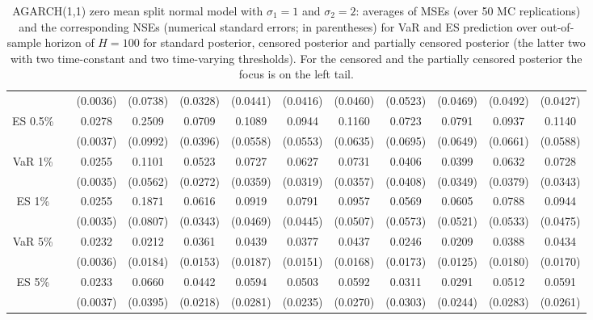 {{\begin{sidewaystable}
\begin{tabular}{cc cc | cccc | cccc}
  && (0.0036) & (0.0738) & (0.0328) & (0.0441) & (0.0416) & (0.0460) &(0.0523) & (0.0469) & (0.0492) & (0.0427) \\ 
\rowcolor{LightCyan} 
ES 0.5\% && 0.0278 & 0.2509 & 0.0709 & 0.1089 & 0.0944 & 0.1160 &0.0723 & 0.0791 & 0.0937 & 0.1140 \\ 
  && (0.0037) & (0.0992) & (0.0396) & (0.0558) & (0.0553) & (0.0635) &(0.0695) & (0.0649) & (0.0661) & (0.0588) \\ [1ex] 
\rowcolor{LightCyan} 
VaR 1\% && 0.0255 & 0.1101 & 0.0523 & 0.0727 & 0.0627 & 0.0731 &0.0406 & 0.0399 & 0.0632 & 0.0728 \\   
 && (0.0035) & (0.0562) & (0.0272) & (0.0359) & (0.0319) & (0.0357) &(0.0408) & (0.0349) & (0.0379) & (0.0343) \\  
\rowcolor{LightCyan} 
ES 1\% && 0.0255 & 0.1871 & 0.0616 & 0.0919 & 0.0791 & 0.0957 &0.0569 & 0.0605 & 0.0788 & 0.0944 \\ 
  && (0.0035) & (0.0807) & (0.0343) & (0.0469) & (0.0445) & (0.0507) &(0.0573) & (0.0521) & (0.0533) & (0.0475) \\ [1ex]
\rowcolor{LightCyan} 
VaR 5\% && 0.0232 & 0.0212 & 0.0361 & 0.0439 & 0.0377 & 0.0437 &0.0246 & 0.0209 & 0.0388 & 0.0434 \\ 
  && (0.0036) & (0.0184) & (0.0153) & (0.0187) & (0.0151) & (0.0168) &(0.0173) & (0.0125) & (0.0180) & (0.0170) \\ 
\rowcolor{LightCyan} 
ES 5\% && 0.0233 & 0.0660 & 0.0442 & 0.0594 & 0.0503 & 0.0592 &0.0311 & 0.0291 & 0.0512 & 0.0591 \\ 
 && (0.0037) & (0.0395) & (0.0218) & (0.0281) & (0.0235) & (0.0270) &(0.0303) & (0.0244) & (0.0283) & (0.0261) \\ 
\hline 
\end{tabular}
 \caption{AGARCH(1,1) zero mean split normal model with $\sigma_{1} = 1$ and $\sigma_{2} = 2$:  averages of MSEs (over 50 MC replications) and the corresponding NSEs (numerical standard errors; in parentheses)  for VaR and ES prediction over out-of-sample horizon of $H=100$  for standard posterior, censored posterior and partially censored posterior (the latter two with two time-constant and two time-varying thresholds).  For the censored and the partially censored posterior the focus is on the left tail.} 
\label{tab:agarch11_pcp_var}  
\end{sidewaystable}
}
}